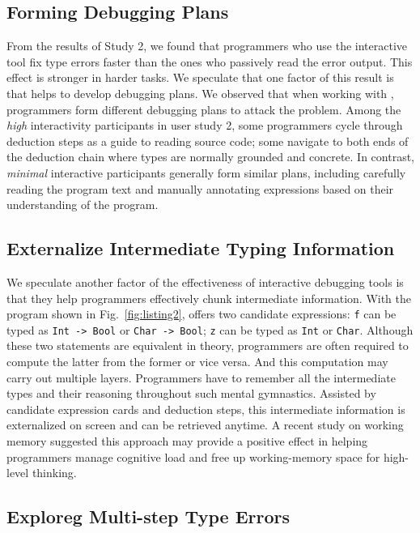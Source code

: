 \subsection{Forming Debugging Plans}
From the results of Study 2, we found that programmers who use the interactive tool fix type errors faster than the ones who passively read the error output. This effect is stronger in harder tasks. We speculate that one factor of this result is that  \chameleon{} helps to develop debugging plans. We observed that when working with \chameleon{}, programmers form different debugging plans to attack the problem. Among the \textit{high} interactivity participants in user study 2, some programmers cycle through deduction steps as a guide to reading source code; some navigate to both ends of the deduction chain where types are normally grounded and concrete. In contrast, \textit{minimal} interactive participants generally form similar plans, including carefully reading the program text and manually annotating expressions based on their understanding of the program.


\subsection{Externalize Intermediate Typing Information}
We speculate another factor of the effectiveness of \chameleon{} interactive debugging tools is that they help programmers effectively chunk intermediate information. With the program shown in Fig.~\ref{fig:listing2}, \chameleon{} offers two candidate expressions: \texttt{f} can be typed as \texttt{Int -> Bool} or \texttt{Char -> Bool}; \texttt{z} can be typed as \texttt{Int} or \texttt{Char}. Although  these two statements are equivalent in theory, programmers are often required to compute the latter from the former or vice versa. And this computation may carry out multiple layers. Programmers have to remember all the intermediate types and their reasoning throughout such mental gymnastics. Assisted by candidate expression cards and deduction steps, this intermediate information is externalized on screen and can be retrieved anytime. A recent study on working memory \cite{Crichton2021-ru} suggested this approach may provide a positive effect in helping programmers manage cognitive load and free up working-memory space for high-level thinking.


\subsection{Exploreg Multi-step Type Errors}

